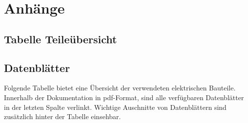 \documentclass[11pt, titlepage]{report}
\begin{document}
	\chapter{Anhänge}
		\section{Tabelle Teileübersicht}
		\section{Datenblätter}
		\label{sec:data}
			Folgende Tabelle bietet eine Übersicht der verwendeten elektrischen Bauteile. Innerhalb der Dokumentation in pdf-Format, sind alle verfügbaren Datenblätter in der letzten Spalte verlinkt. Wichtige Auschnitte von Datenblättern sind zusätzlich hinter der Tabelle einsehbar.
\end{document}
